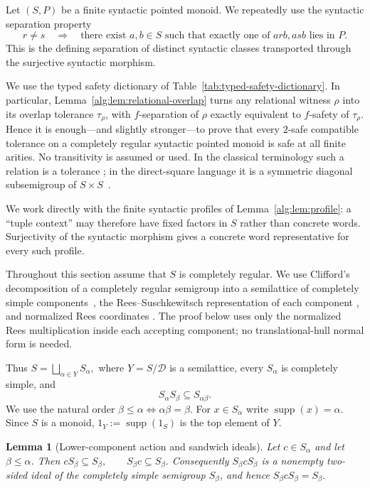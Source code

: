 \documentclass[10pt,a4paper]{article}
\newtheorem{lemma}[theorem]{Lemma}
\theoremstyle{definition}
\theoremstyle{remark}
\begin{document}
Let $(S,P)$ be a finite syntactic pointed monoid.  We repeatedly use the
syntactic separation property
\[
 r\ne s
 \quad\Longrightarrow\quad
 \text{there exist }a,b\in S\text{ such that exactly one of }arb,asb\text{ lies in }P.
\tag{Syn}
\]
This is the defining separation of distinct syntactic classes transported
through the surjective syntactic morphism.

We use the typed safety dictionary of
Table~\ref{tab:typed-safety-dictionary}.  In particular,
Lemma~\ref{alg:lem:relational-overlap} turns any relational witness \(\rho\)
into its overlap tolerance \(\tau_\rho\), with \(f\)-separation of \(\rho\)
exactly equivalent to \(f\)-safety of \(\tau_\rho\).  Hence it is enough---and
slightly stronger---to prove that every \(2\)-safe compatible tolerance on a
completely regular syntactic pointed monoid is safe at all finite arities.
No transitivity is assumed or used.  In the classical terminology such a
relation is a tolerance
\cite{ZelinkaTolerance1975,Pondelicek1978,KumaresanTolerance1984}; in the
direct-square language it is a symmetric diagonal subsemigroup of
\(S\times S\)~\cite{BarberRuskucDirectSquare,BarberRuskucDiagonal2026}.

We work directly with the finite syntactic profiles of
Lemma~\ref{alg:lem:profile}: a ``tuple context'' may therefore have fixed
factors in $S$ rather than concrete words.  Surjectivity of the syntactic
morphism gives a concrete word representative for every such profile.

Throughout this section assume that $S$ is completely regular.  We use
Clifford's decomposition of a completely regular semigroup into a semilattice
of completely simple components~\cite[Theorem~4.1.3]{Howie1995}, the
Rees--Suschkewitsch representation of each component
\cite[Theorem~3.3.1]{Howie1995}, and normalized Rees coordinates
\cite[Theorem~3.4.2]{Howie1995}.  The proof below uses only the normalized
Rees multiplication inside each accepting component; no translational-hull
normal form is needed.

Thus
\(S=\bigsqcup_{\alpha\in Y}S_\alpha,\) where $Y=S/\mathcal D$ is a semilattice,
every $S_\alpha$ is completely simple, and
\[
S_\alpha S_\beta\subseteq S_{\alpha\beta}.
\tag{CR1}
\]
We use the natural order
\(\beta\le\alpha \Longleftrightarrow \alpha\beta=\beta.\)
For $x\in S_\alpha$ write $\operatorname{supp}(x)=\alpha$.  Since $S$ is a
monoid, $1_Y:=\operatorname{supp}(1_S)$ is the top element of $Y$.

\begin{lemma}[Lower-component action and sandwich ideals]
\label{cr:lem:sandwich-ideal}
Let \(c\in S_\alpha\) and let \(\beta\le\alpha\). Then
\(
cS_\beta\subseteq S_\beta,
\qquad
S_\beta c\subseteq S_\beta.
\)
Consequently \(S_\beta c S_\beta\) is a nonempty two-sided ideal of the
completely simple semigroup \(S_\beta\), and hence
\(S_\beta c S_\beta=S_\beta.\)
\end{lemma}
\end{document}
